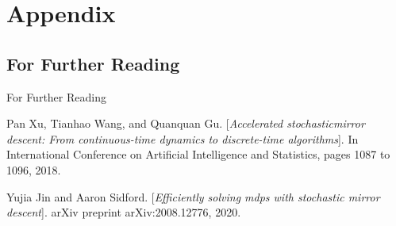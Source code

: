\documentclass[english]{beamer}
\begin{document}
\appendix

\section*{Appendix}

\subsection*{For Further Reading}
\begin{frame}[allowframebreaks]{For Further Reading}


\beamertemplatebookbibitems
\begin{thebibliography}{1}
Pan  Xu,  Tianhao  Wang,  and  Quanquan  Gu. 
[\textit{Accelerated  stochasticmirror descent:  From continuous-time dynamics to discrete-time algorithms}]. 
In International Conference on Artificial Intelligence and Statistics, pages 1087 to 1096, 2018.

Yujia Jin and Aaron Sidford. 
[\textit{Efficiently solving mdps with stochastic mirror descent}]. 
arXiv preprint arXiv:2008.12776, 2020.


\end{thebibliography}
\end{frame}
\end{document}

